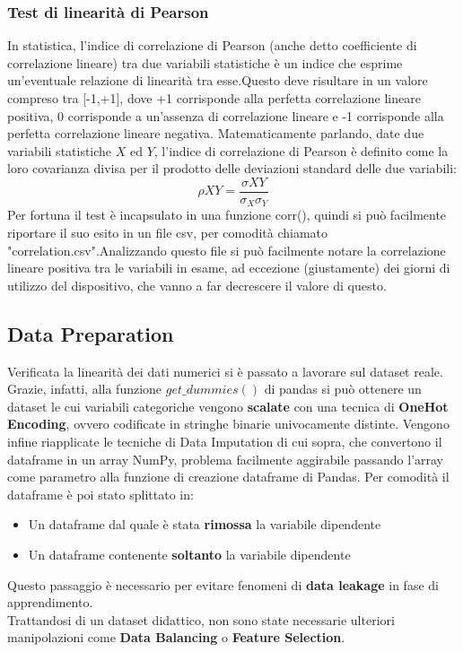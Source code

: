 \documentclass{article}
\begin{document}
    \subsubsection{Test di linearità di Pearson}\newline
    In statistica, l'indice di correlazione di Pearson (anche detto coefficiente di correlazione lineare) tra due variabili statistiche è un indice che esprime un'eventuale relazione di linearità tra esse.\newline Questo deve risultare in un valore compreso tra [-1,+1], dove +1 corrisponde alla perfetta correlazione lineare positiva, 0 corrisponde a un'assenza di correlazione lineare e -1 corrisponde alla perfetta correlazione lineare negativa.\newline
    Matematicamente parlando, date due variabili statistiche $X$ ed $Y$, l'indice di correlazione di Pearson è definito come la loro covarianza divisa per il prodotto delle deviazioni standard delle due variabili:\newline
    \[ \rho XY= \frac{\sigma XY}{\sigma_{X}\sigma_{Y}}\]
    \newline
    Per fortuna il test è incapsulato in una funzione corr(), quindi si può facilmente riportare il suo esito in un file csv, per comodità chiamato "correlation.csv".\newline Analizzando questo file si può facilmente notare la correlazione lineare positiva tra le variabili in esame, ad eccezione (giustamente) dei giorni di utilizzo del dispositivo, che vanno a far decrescere il valore di questo.\newline\\
    \newpage
    \subsection{Data Preparation}
    Verificata la linearità dei dati numerici si è passato a lavorare sul dataset reale. Grazie, infatti, alla funzione $get\_dummies()$
    di pandas si può ottenere un dataset le cui variabili categoriche vengono \textbf{scalate} con una tecnica di \textbf{OneHot Encoding}, ovvero codificate in stringhe binarie univocamente distinte.\newline
    Vengono infine riapplicate le tecniche di Data Imputation di cui sopra, che convertono il dataframe in un array NumPy, problema facilmente aggirabile passando l'array come parametro alla funzione di creazione dataframe di Pandas. Per comodità il dataframe è poi stato splittato in:
    \begin{itemize}
        \item Un dataframe dal quale è stata \textbf{rimossa} la variabile dipendente
        \item Un dataframe contenente \textbf{soltanto} la variabile dipendente
    \end{itemize}\newline
    Questo passaggio è necessario per evitare fenomeni di \textbf{data leakage} in fase di apprendimento.\\
    Trattandosi di un dataset didattico, non sono state necessarie ulteriori manipolazioni come \textbf{Data Balancing} o \textbf{Feature Selection}.
\end{document}
